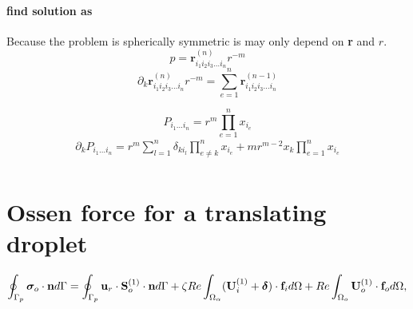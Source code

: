 \paragraph{find solution as}

Because the problem is spherically symmetric is may only depend on \textbf{r} and $r$. 
\begin{equation}
    p = \textbf{r}^{(n)}_{i_1i_2i_3\ldots i_n}r^{-m}
\end{equation}
\begin{equation}
    \partial_k 
    \textbf{r}^{(n)}_{i_1i_2i_3\ldots i_n}r^{-m}
    =
    \sum_{e=1}^{n} \textbf{r}^{(n-1)}_{i_1i_2i_3\ldots i_n}
\end{equation}

\begin{equation}
    P_{i_1\ldots i_n} = r^m \prod_{e=1}^{n} x_{i_e} 
\end{equation}
\begin{align*}
    \partial_k P_{i_1\ldots i_n} = 
    r^m
    \sum_{l=1}^n \delta_{ki_l}\prod_{e\neq k}^{n} x_{i_e} 
    + m r^{m-2} x_k  \prod_{e=1}^{n} x_{i_e} \\
\end{align*}



\section{Ossen force for a translating droplet}
\begin{equation}
    \intS[p]{\bm\sigma_{o}\cdot \textbf{n}}
    =
    \intS[p]{\textbf{u}_{r}\cdot \textbf{S}_{o}^{(1)}\cdot \textbf{n}}
    + \zeta Re \intO{(\textbf{U}_{i}^{(1)} + \bm\delta)\cdot \textbf{f}_{i}}
    + Re\intO[o]{\textbf{U}_{o}^{(1)}\cdot \textbf{f}_{o}},
\end{equation}

